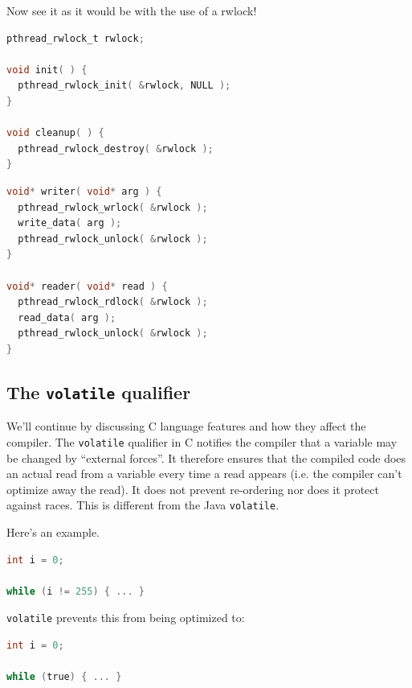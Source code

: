 \documentclass[a4paper]{report}
\begin{document}
Now see it as it would be with the use of a rwlock!

\begin{multicols}{2}
\begin{lstlisting}[language=C]
pthread_rwlock_t rwlock;

void init( ) {
  pthread_rwlock_init( &rwlock, NULL );
}

void cleanup( ) {
  pthread_rwlock_destroy( &rwlock );
}
\end{lstlisting}

\columnbreak

\begin{lstlisting}[language=C]
void* writer( void* arg ) {
  pthread_rwlock_wrlock( &rwlock );
  write_data( arg );
  pthread_rwlock_unlock( &rwlock );
}

void* reader( void* read ) {
  pthread_rwlock_rdlock( &rwlock );
  read_data( arg );
  pthread_rwlock_unlock( &rwlock );
}
\end{lstlisting}

\end{multicols}



\subsection*{The {\tt volatile} qualifier}
We'll continue by discussing C language features and how they affect
the compiler. The {\tt volatile} qualifier in C notifies the compiler that
a variable may be changed by ``external forces''. It therefore ensures
that the compiled code does an actual read from a variable every time
a read appears (i.e. the compiler can't optimize away the read). It
does not prevent re-ordering nor does it protect against races. This is different from the Java {\tt volatile}.

Here's an example.
  \begin{lstlisting}[language=C]
int i = 0;

while (i != 255) { ... }
  \end{lstlisting}

{\tt volatile} prevents this from being optimized to:

  \begin{lstlisting}[language=C]
int i = 0;

while (true) { ... }
  \end{lstlisting}
\end{document}
